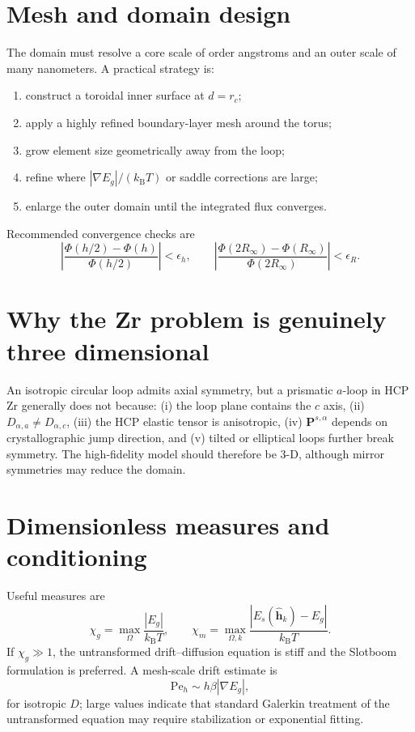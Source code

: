 \documentclass[11pt]{article}
\newcommand{\kb}{k_{\mathrm B}}
\newcommand{\bP}{\bm{P}}
\newcommand{\bh}{\bm{h}}
\newcommand{\cO}{\Omega}
\begin{document}
\section{Mesh and domain design}
The domain must resolve a core scale of order angstroms and an outer scale of many nanometers. A practical strategy is:
\begin{enumerate}
\item construct a toroidal inner surface at $d=r_c$;
\item apply a highly refined boundary-layer mesh around the torus;
\item grow element size geometrically away from the loop;
\item refine where $|\nabla E_g|/(\kb T)$ or saddle corrections are large;
\item enlarge the outer domain until the integrated flux converges.
\end{enumerate}
Recommended convergence checks are
\begin{equation}
\left|\frac{\Phi(h/2)-\Phi(h)}{\Phi(h/2)}\right|<\epsilon_h,
\qquad
\left|\frac{\Phi(2R_\infty)-\Phi(R_\infty)}{\Phi(2R_\infty)}\right|<\epsilon_R.
\end{equation}

\section{Why the Zr problem is genuinely three dimensional}
An isotropic circular loop admits axial symmetry, but a prismatic $a$-loop in HCP Zr generally does not because: (i) the loop plane contains the $c$ axis, (ii) $D_{\alpha,a}\ne D_{\alpha,c}$, (iii) the HCP elastic tensor is anisotropic, (iv) $\bP^{s,\alpha}$ depends on crystallographic jump direction, and (v) tilted or elliptical loops further break symmetry. The high-fidelity model should therefore be 3-D, although mirror symmetries may reduce the domain.

\section{Dimensionless measures and conditioning}
Useful measures are
\begin{equation}
\chi_g=\max_{\cO}\frac{|E_g|}{\kb T},
\qquad
\chi_m=\max_{\cO,k}\frac{|E_s(\hat{\bh}_k)-E_g|}{\kb T}.
\end{equation}
If $\chi_g\gg1$, the untransformed drift--diffusion equation is stiff and the Slotboom formulation is preferred. A mesh-scale drift estimate is
\begin{equation}
\mathrm{Pe}_h\sim h\beta|\nabla E_g|,
\end{equation}
for isotropic $D$; large values indicate that standard Galerkin treatment of the untransformed equation may require stabilization or exponential fitting.
\end{document}
